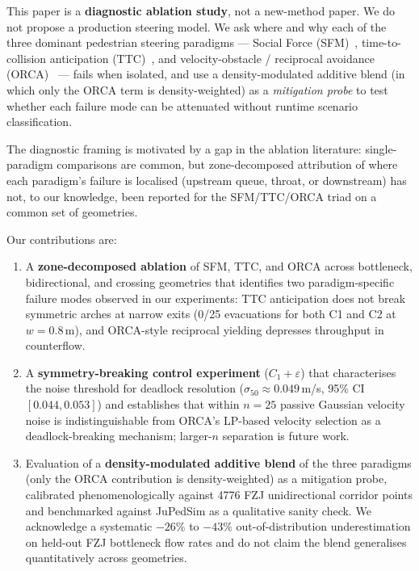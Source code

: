\documentclass[a4paper,twoside]{article}
\begin{document}
This paper is a \textbf{diagnostic ablation study}, not a new-method paper. We do not propose a production steering model. We ask where and why each of the three dominant pedestrian steering paradigms --- Social Force (SFM)~\cite{Helbing95,Helbing00}, time-to-collision anticipation (TTC)~\cite{Karamouzas14}, and velocity-obstacle / reciprocal avoidance (ORCA)~\cite{Fiorini98,VandenBerg11} --- fails when isolated, and use a density-modulated additive blend (in which only the ORCA term is density-weighted) as a \emph{mitigation probe} to test whether each failure mode can be attenuated without runtime scenario classification.

The diagnostic framing is motivated by a gap in the ablation literature: single-paradigm comparisons are common, but zone-decomposed attribution of where each paradigm's failure is localised (upstream queue, throat, or downstream) has not, to our knowledge, been reported for the SFM/TTC/ORCA triad on a common set of geometries.

Our contributions are:
\begin{enumerate}
    \item A \textbf{zone-decomposed ablation} of SFM, TTC, and ORCA across bottleneck, bidirectional, and crossing geometries that identifies two paradigm-specific failure modes observed in our experiments: TTC anticipation does not break symmetric arches at narrow exits (0/25 evacuations for both C1 and C2 at $w=0.8$\,m), and ORCA-style reciprocal yielding depresses throughput in counterflow.
    \item A \textbf{symmetry-breaking control experiment} ($C_1+\varepsilon$) that characterises the noise threshold for deadlock resolution ($\sigma_{50}\approx 0.049$\,m/s, 95\% CI $[0.044, 0.053]$) and establishes that within $n=25$ passive Gaussian velocity noise is indistinguishable from ORCA's LP-based velocity selection as a deadlock-breaking mechanism; larger-$n$ separation is future work.
    \item Evaluation of a \textbf{density-modulated additive blend} of the three paradigms (only the ORCA contribution is density-weighted) as a mitigation probe, calibrated phenomenologically against 4776 FZJ unidirectional corridor points and benchmarked against JuPedSim as a qualitative sanity check. We acknowledge a systematic $-26\%$ to $-43\%$ out-of-distribution underestimation on held-out FZJ bottleneck flow rates and do not claim the blend generalises quantitatively across geometries.
\end{enumerate}
\end{document}
